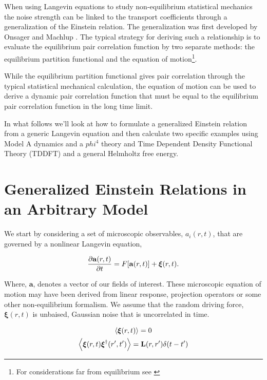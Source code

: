 When using Langevin equations to study non-equilibrium statistical mechanics the noise strength can be linked to the transport coefficients through a generalization of the Einstein relation. The generalization was first developed by Onsager and Machlup \cite{OnsagerMachlup}. The typical strategy for deriving such a relationship is to evaluate the equilibrium pair correlation function by two separate methods: the equilibrium partition functional and the equation of motion\footnote{For considerations far from equilibrium see \cite{Lax, Ronis, Fox_and_Uhlenbeck}}.

While the equilibrium partition functional gives pair correlation through the typical statistical mechanical calculation, the equation of motion can be used to derive a dynamic pair correlation function that must be equal to the equilibrium pair correlation function in the long time limit.

In what follows we'll look at how to formulate a generalized Einstein relation from a generic Langevin equation and then calculate two specific examples using Model A dynamics and a $phi^4$ theory and Time Dependent Density Functional Theory (TDDFT) and a general Helmholtz free energy.

\section{Generalized Einstein Relations in an Arbitrary Model}

We start by considering a set of microscopic observables, $a_i(r, t)$, that are governed by a nonlinear Langevin equation,

\begin{equation}
	\frac{\partial \mathbf{a}(r, t)}{\partial t} = F[\mathbf{a}(r,t)] + \boldsymbol{\xi}(r,t).
\end{equation}

Where, $\mathbf{a}$, denotes a vector of our fields of interest. These microscopic equation of motion may have been derived from linear response, projection operators or some other non-equilibrium formalism. We assume that the random driving force, $\boldsymbol{\xi}(r, t)$ is unbaised, Gaussian noise that is uncorrelated in time.

\begin{gather}
	\left\langle \boldsymbol{\xi}(r,t)\right\rangle = 0 \\
	\left\langle \boldsymbol{\xi}(r,t)\boldsymbol{\xi}^\dagger(r^\prime,t^\prime)\right\rangle =
	\mathbf{L}(r, r^\prime)\delta(t-t^\prime)
\end{gather}

